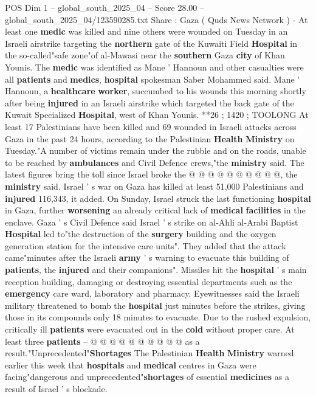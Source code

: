 \begin{textsample}{POS Dim 1 – global\_south\_2025\_04 – Score 28.00 – global\_south\_2025\_04/123590285.txt}  \label{ex:f1_pos_287}
Share : Gaza ( Quds News Network ) - At least one \textbf{medic} was killed and nine others were wounded on Tuesday in an Israeli airstrike targeting the \textbf{northern} gate of the Kuwaiti Field \textbf{Hospital} in the so-called"safe zone"of al-Mawasi near the \textbf{southern} Gaza \textbf{city} of Khan Younis.
The \textbf{medic} was identified as Mane ' Hannoun and other casualties were all \textbf{patients} and \textbf{medics}, \textbf{hospital} spokesman Saber Mohammed said.
Mane ' Hannoun, a \textbf{healthcare} \textbf{worker}, succumbed to his wounds this morning shortly after being \textbf{injured} in an Israeli airstrike which targeted the back gate of the Kuwait Specialized \textbf{Hospital}, west of Khan Younis. **26 ; 1420 ; TOOLONG At least 17 Palestinians have been killed and 69 wounded in Israeli attacks across Gaza in the past 24 hours, according to the Palestinian \textbf{Health} \textbf{Ministry} on Tuesday."A number of victims remain under the rubble and on the roads, unable to be reached by \textbf{ambulances} and Civil Defence crews,"the \textbf{ministry} said.
The latest figures bring the toll since Israel broke the @ @ @ @ @ @ @ @ @ @, the \textbf{ministry} said.
Israel ' s war on Gaza has killed at least 51,000 Palestinians and \textbf{injured} 116,343, it added.
On Sunday, Israel struck the last functioning \textbf{hospital} in Gaza, further \textbf{worsening} an already critical lack of \textbf{medical} \textbf{facilities} in the enclave.
Gaza ' s Civil Defence said Israel ' s strike on al-Ahli al-Arabi Baptist \textbf{Hospital} led to"the destruction of the \textbf{surgery} building and the oxygen generation station for the intensive care units".
They added that the attack came"minutes after the Israeli \textbf{army} ' s warning to evacuate this building of \textbf{patients}, the \textbf{injured} and their companions".
Missiles hit the \textbf{hospital} ' s main reception building, damaging or destroying essential departments such as the \textbf{emergency} care ward, laboratory and pharmacy.
Eyewitnesses said the Israeli military threatened to bomb the \textbf{hospital} just minutes before the strikes, giving those in its compounds only 18 minutes to evacuate.
Due to the rushed expulsion, critically ill \textbf{patients} were evacuated out in the \textbf{cold} without proper care.
At least three \textbf{patients} -- @ @ @ @ @ @ @ @ @ @ as a result."Unprecedented"\textbf{Shortages} The Palestinian \textbf{Health} \textbf{Ministry} warned earlier this week that \textbf{hospitals} and \textbf{medical} centres in Gaza were facing"dangerous and unprecedented"\textbf{shortages} of essential \textbf{medicines} as a result of Israel ' s blockade.

\end{textsample}
